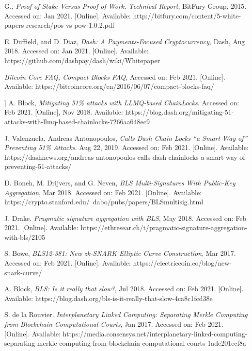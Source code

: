 \documentclass[peerreview]{ieeesyscoin}
\begin{document}
\begin{thebibliography}{00}
 G., \textit{Proof of Stake Versus Proof of Work. Technical Report}, BitFury Group, 2015. Accessed on: Jan 2021. [Online]. Available: http://bitfury.com/content/5-white-papers-research/pos-vs-pow-1.0.2.pdf 

 E. Duffield, and D. Diaz, \textit{Dash: A Payments-Focused Cryptocurrency}, Dash, Aug 2018. Accessed on: Jan 2021. [Online]. Available: https://github.com/dashpay/dash/wiki/Whitepaper

 \textit{Bitcoin Core FAQ, Compact Blocks FAQ}, Accessed on: Feb 2021. [Online]. Available: https://bitcoincore.org/en/2016/06/07/compact-blocks-faq/

 ] A. Block, \textit{Mitigating 51\% attacks with LLMQ-based ChainLocks}. Accessed on: Feb 2021. [Online], Nov 2018. Available: https://blog.dash.org/mitigating-51-attacks-with-llmq-based-chainlocks-7266aa648ec9

 J. Valenzuela, Andreas Antonopoulos, \textit{Calls Dash Chain Locks “a Smart Way of” Preventing 51\% Attacks}. Aug 22, 2019. Accessed on: Feb 2021. [Online]. Available: https://dashnews.org/andreas-antonopoulos-calls-dash-chainlocks-a-smart-way-of-preventing-51-attacks/

 D. Boneh, M. Drijvers, and G. Neven, \textit{BLS Multi-Signatures With Public-Key Aggregation}, Mar 2018. Accessed on: Feb 2021. [Online]. Available: https://crypto.stanford.edu/~dabo/pubs/papers/BLSmultisig.html

 J. Drake. \textit{Pragmatic signature aggregation with BLS}, May 2018. Accessed on: Feb 2021. [Online]. Available:  https://ethresear.ch/t/pragmatic-signature-aggregation-with-bls/2105

 S. Bowe, \textit{BLS12-381: New zk-SNARK Elliptic Curve Construction}, Mar 2017. Accessed on: Feb 2021. [Online]. Available: https://electriccoin.co/blog/new-snark-curve/

  A. Block, \textit{BLS: Is it really that slow?}, Jul 2018. Accessed on: Feb 2021. [Online]. Available: https://blog.dash.org/bls-is-it-really-that-slow-4ca8c1fcd38e

  S. de la Rouvier. \textit{Interplanetary Linked Computing: Separating Merkle Computing from Blockchain Computational Courts}, Jan 2017. Accessed on: Feb 2021. [Online]. Available: https://media.consensys.net/interplanetary-linked-computing-separating-merkle-computing-from-blockchain-computational-courts-1ade201ecf8a


\end{thebibliography}
\end{document}
